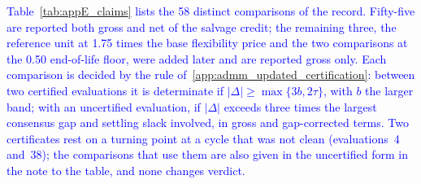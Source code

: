 \textcolor{blue}{
    Table~\ref{tab:appE_claims} lists the 58 distinct comparisons of the record. Fifty-five are reported both gross and net of the salvage credit; the remaining three, the reference unit at 1.75 times the base flexibility price and the two comparisons at the 0.50 end-of-life floor, were added later and are reported gross only. Each comparison is decided by the rule of~\ref{app:admm_updated_certification}: between two certified evaluations it is determinate if $|\Delta| \geq \max\{3b, 2\tau\}$, with $b$ the larger band; with an uncertified evaluation, if $|\Delta|$ exceeds three times the largest consensus gap and settling slack involved, in gross and gap-corrected terms. Two certificates rest on a turning point at a cycle that was not clean (evaluations~4 and~38); the comparisons that use them are also given in the uncertified form in the note to the table, and none changes verdict.
}

